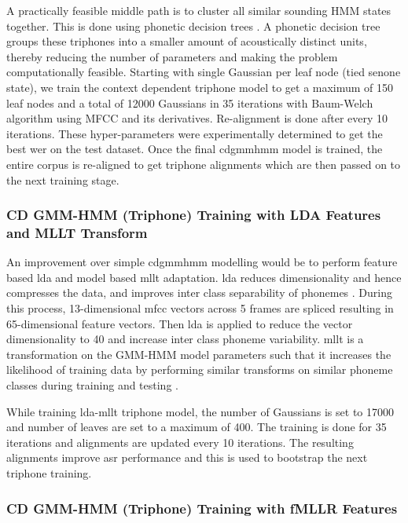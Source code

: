 A practically feasible middle path is to cluster all similar sounding HMM
states together. This is done using phonetic decision trees
\cite{young1994tree}.
A phonetic decision tree groups these triphones into a smaller amount of
acoustically distinct units, thereby reducing the number of parameters and
making the problem computationally feasible. Starting with single Gaussian per
leaf node (tied senone state), we train the context dependent triphone model to get a maximum of
150 leaf nodes and a total of 12000 Gaussians in 35 iterations with Baum-Welch
algorithm using MFCC and its derivatives. Re-alignment is done after every 10 iterations. These hyper-parameters
were experimentally determined to get the best \gls{wer} on the test dataset.
Once the final \gls{cdgmmhmm} model is trained, the entire corpus is re-aligned to
get triphone alignments which are then passed on to the next training stage.

\subsubsection{CD GMM-HMM (Triphone) Training with LDA Features and MLLT Transform}

An improvement over simple \gls{cdgmmhmm} modelling would be to
perform feature based \acrfull{lda} and model based \acrfull{mllt} adaptation.
\Gls{lda} reduces dimensionality and hence compresses the data, and improves
inter class separability of phonemes \cite{haeb1992linear}. During this process,
13-dimensional \gls{mfcc} vectors across 5 frames are spliced resulting in
65-dimensional feature vectors. Then \gls{lda} is applied to reduce the vector
dimensionality to 40 and increase inter class phoneme variability. \gls{mllt}
is a transformation on the GMM-HMM model parameters such that it increases the
likelihood of training data by performing similar transforms on similar phoneme
classes during training and testing \cite{gales1999semi}.

While training \gls{lda}-\gls{mllt} triphone model, the number of Gaussians is
set to 17000 and number of leaves are set to a maximum of 400. The training is
done for 35 iterations and alignments are updated every 10 iterations. The
resulting alignments improve \gls{asr} performance and this is used
to bootstrap the next triphone training.

\subsubsection{CD GMM-HMM (Triphone) Training with fMLLR Features}

